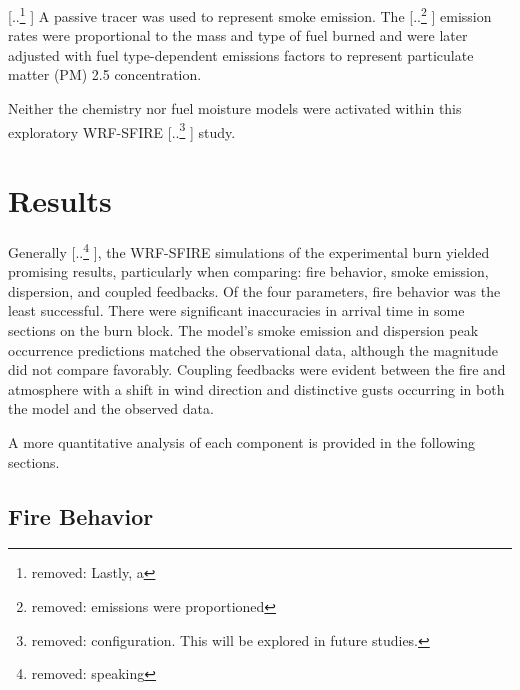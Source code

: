 \documentclass[preprints,article,accept,moreauthors,pdftex]{Definitions/mdpi}
\providecommand{\DIFadd}[1]{{\protect\color{blue} \sf #1}} %
\providecommand{\DIFdel}[1]{{\protect\color{red} [..\footnote{removed: #1} ]}} %
\providecommand{\DIFaddbegin}{} %
\providecommand{\DIFaddend}{} %
\providecommand{\DIFdelbegin}{} %
\providecommand{\DIFdelend}{} %
\begin{document}
\DIFdelbegin \DIFdel{Lastly, a }\DIFdelend \DIFaddbegin \DIFadd{A }\DIFaddend passive tracer was used to represent smoke emission. The \DIFdelbegin \DIFdel{emissions were proportioned }\DIFdelend \DIFaddbegin \DIFadd{emission rates were proportional }\DIFaddend to the mass and type of fuel burned and \DIFaddbegin \DIFadd{were }\DIFaddend later adjusted with fuel type-dependent emissions factors to represent particulate matter (PM) 2.5 concentration.

Neither the chemistry nor fuel moisture models were activated within this \DIFaddbegin \DIFadd{exploratory }\DIFaddend WRF-SFIRE \DIFdelbegin \DIFdel{configuration.
This will be explored in future studies.
}\DIFdelend \DIFaddbegin \DIFadd{study.
}\DIFaddend %
\section{Results}

Generally\DIFdelbegin \DIFdel{speaking}\DIFdelend , the WRF-SFIRE simulations of the experimental burn yielded promising results, particularly when comparing: fire behavior, smoke emission, dispersion, and coupled feedbacks. Of the four parameters, fire behavior was the least successful. There were significant inaccuracies in arrival time in some sections on the burn block. The model’s smoke emission and dispersion peak occurrence predictions matched the observational data, although the magnitude did not compare favorably.
Coupling feedbacks were evident between the fire and atmosphere with a shift in wind direction and distinctive gusts occurring in both the model and the observed data.

A more quantitative analysis of each component is provided in the following sections.

\subsection{Fire Behavior}
\end{document}
